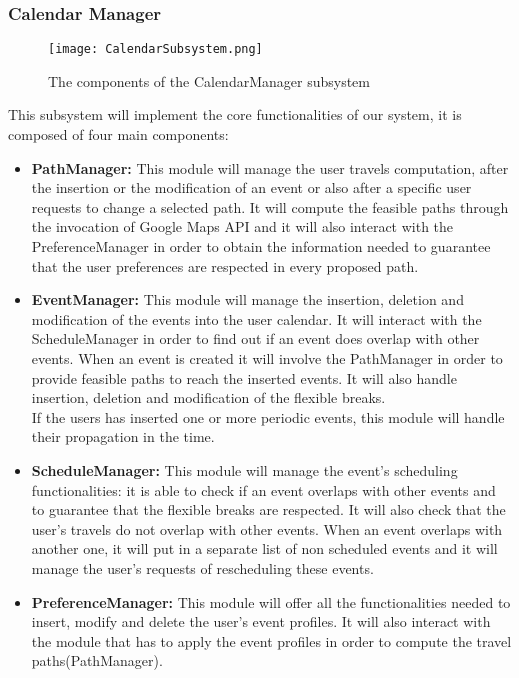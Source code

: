 \subsubsection{Calendar Manager}
\label{subsubsect:Calendar Manager}
\begin{figure}[H]
	\begin{center}
		\hspace*{-60pt}
		\texttt{[image: CalendarSubsystem.png]}
	\end{center}
	\caption{The components of the CalendarManager subsystem}
\end{figure}
	This subsystem will implement the core functionalities of our system, it is composed of four main components:
	\begin{itemize}
		\item \textbf{PathManager:} This module will manage the user travels computation, after the insertion or the modification of an event or also after a specific user requests to change a selected path. It will compute the feasible paths through the invocation of Google Maps API and it will also interact with the PreferenceManager in order to obtain the information needed to guarantee that the user preferences are respected in every proposed path. 
		\item \textbf{EventManager:} This module will manage the insertion, deletion and modification of the events into the user calendar. It will interact with the ScheduleManager in order to find out if an event does overlap with other events. When an event is created it will involve the PathManager in order to provide feasible paths to reach the inserted events. It will also handle insertion, deletion and modification of the flexible breaks. \\
	If the users has inserted one or more periodic events, this module will handle their propagation in the time. 
		\item \textbf{ScheduleManager:} This module will manage the event's scheduling functionalities: it is able to check if an event overlaps with other events and to guarantee that the flexible breaks are respected. It will also check that the user's travels do not overlap with other events. When an event overlaps with another one, it will put in a separate list of non scheduled events and it will manage the user's requests of rescheduling these events.
		\item \textbf{PreferenceManager:} This module will offer all the functionalities needed to insert, modify and delete the user's event profiles. It will also interact with the module that has to apply the event profiles in order to compute the travel paths(PathManager).
	\end{itemize}
	
